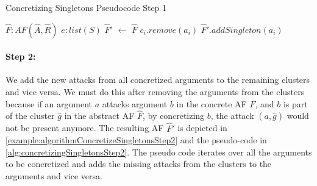 \begin{algorithm}[H]
    \caption{Concretizing Singletons Pseudocode Step 1}\label{alg:concretizingSingletonsStep1}
    \begin{algorithmic}[1]
        \Require $\hat{F}: AF(\hat{A}, \hat{R})$ 
        \Require $e: list(S)$ 
        \State $\hat{F}'$ $\gets$ $\hat{F}$ 
                    \State $c_i.remove(a_i)$
                \EndIf
                \EndFor
            \State $\hat{F}'.addSingleton(a_i)$
        \EndFor
    \end{algorithmic}
\end{algorithm}




\paragraph{Step 2:} We add the new attacks from all concretized arguments to the remaining clusters and vice versa. We must do this after removing the arguments from the clusters because if an argument $a$ attacks argument $b$ in the concrete AF $F$, and $b$ is part of the cluster $\hat{g}$ in the abstract AF $\hat{F}$, by concretizing $b$, the attack $(a,\hat{g})$ would not be present anymore. The resulting AF $\hat{F}'$ is depicted in \cref{example:algorithmConcretizeSingletonsStep2} and the pseudo-code in \cref{alg:concretizingSingletonsStep2}. The pseudo code iterates over all the arguments to be concretized and adds the missing attacks from the clusters to the arguments and vice versa.


